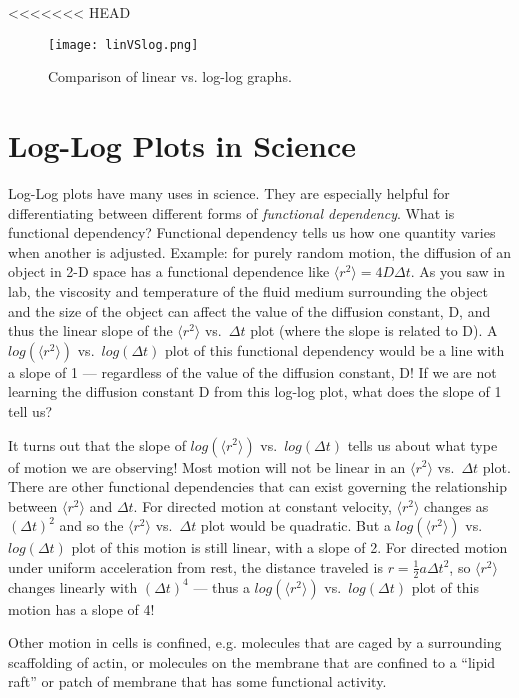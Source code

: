 <<<<<<< HEAD
\begin{figure}[h]
	\centering
	\texttt{[image: linVSlog.png]}
	\caption{Comparison of linear vs. log-log graphs.}
	\label{fig:lin-log}
\end{figure}

\section{Log-Log Plots in Science}
Log-Log plots have many uses in science.
They are especially helpful for differentiating between different forms of \emph{functional dependency}.
What is functional dependency? 
Functional dependency tells us how one quantity varies when another is adjusted. 
Example: for purely random motion, the diffusion of an object in 2-D space has a functional dependence like $\langle r^{2} \rangle = 4 D \Delta t$. 
As you saw in lab, the viscosity and temperature of the fluid medium surrounding the object and the size of the object can affect the value of the diffusion constant, D, and thus the linear slope of the $\langle r^{2} \rangle$ vs.\ $\Delta t$ plot (where the slope is related to D). 
A $log(\langle r^{2} \rangle)$ vs.\ $log(\Delta t)$ plot of this functional dependency would be a line with a slope of 1 — regardless of the value of the diffusion constant, D! 
If we are not learning the diffusion constant D from this log-log plot, what does the slope of 1 tell us?
\par 
It turns out that the slope of $log(\langle r^{2} \rangle)$ vs.\ $log(\Delta t)$ tells us about what type of motion we are observing! 
Most motion will not be linear in an $\langle r^{2} \rangle$ vs.\ $\Delta t$ plot. 
There are other functional dependencies that can exist governing the relationship between $\langle r^{2} \rangle$ and $\Delta t$. 
For directed motion at constant velocity, $\langle r^{2} \rangle$ changes as $(\Delta t)^{2}$ and so the $\langle r^{2} \rangle$ vs.\ $\Delta t$ plot would be quadratic. 
But a $log(\langle r^{2} \rangle)$ vs.\ $log(\Delta t)$ plot of this motion is still linear, with a slope of 2. 
For directed motion under uniform acceleration from rest, the distance traveled is $r = \frac{1}{2} a \Delta t^{2}$, so $\langle r^{2} \rangle$ changes linearly with $(\Delta t)^{4}$ — thus a $log(\langle r^{2} \rangle)$ vs.\ $log(\Delta t)$ plot of this motion has a slope of 4!
\par 
Other motion in cells is confined, e.g. molecules that are caged by a surrounding scaffolding of actin, or molecules on the membrane that are confined to a ``lipid raft'' or patch of membrane that has some functional activity. 
